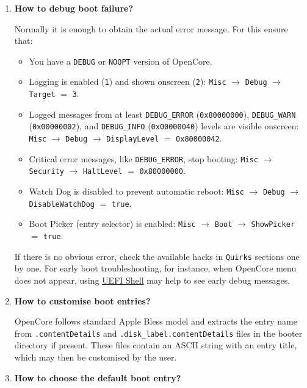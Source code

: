 \documentclass[]{article}
\providecommand{\tightlist}{%
  \setlength{\itemsep}{0pt}\setlength{\parskip}{0pt}}
\begin{document}
\begin{enumerate}
\item
  \textbf{How to debug boot failure?}

  Normally it is enough to obtain the actual error message. For this
  ensure that:
  \begin{itemize}
  \tightlist
  \item You have a \texttt{DEBUG} or \texttt{NOOPT} version of OpenCore.
  \item Logging is enabled (\texttt{1}) and shown onscreen (\texttt{2}):
  \texttt{Misc} $\rightarrow$ \texttt{Debug} $\rightarrow$ \texttt{Target}
  $=$ \texttt{3}.
  \item Logged messages from at least \texttt{DEBUG\_ERROR}
  (\texttt{0x80000000}), \texttt{DEBUG\_WARN} (\texttt{0x00000002}), and
  \texttt{DEBUG\_INFO} (\texttt{0x00000040}) levels are visible onscreen:
  \texttt{Misc} $\rightarrow$ \texttt{Debug} $\rightarrow$ \texttt{DisplayLevel}
  $=$ \texttt{0x80000042}.
  \item Critical error messages, like \texttt{DEBUG\_ERROR}, stop booting:
  \texttt{Misc} $\rightarrow$ \texttt{Security}
  $\rightarrow$ \texttt{HaltLevel} $=$ \texttt{0x80000000}.
  \item Watch Dog is disabled to prevent automatic reboot:
  \texttt{Misc} $\rightarrow$ \texttt{Debug} $\rightarrow$
  \texttt{DisableWatchDog} $=$ \texttt{true}.
  \item Boot Picker (entry selector) is enabled: \texttt{Misc}
  $\rightarrow$ \texttt{Boot} $\rightarrow$ \texttt{ShowPicker} $=$ \texttt{true}.
  \end{itemize}

  If there is no obvious error, check the available hacks in \texttt{Quirks} sections
  one by one. For early boot troubleshooting, for instance, when OpenCore menu does not appear,
  using \href{https://github.com/acidanthera/OpenCoreShell}{UEFI Shell} may help to see
  early debug messages.

\item
  \textbf{How to customise boot entries?}

  OpenCore follows standard Apple Bless model and extracts the entry name
  from \texttt{.contentDetails} and \texttt{.disk\_label.contentDetails} files in the
  booter directory if present. These files contain an ASCII string with an entry title,
  which may then be customised by the user.

\item
  \textbf{How to choose the default boot entry?}


\end{enumerate}
\end{document}
